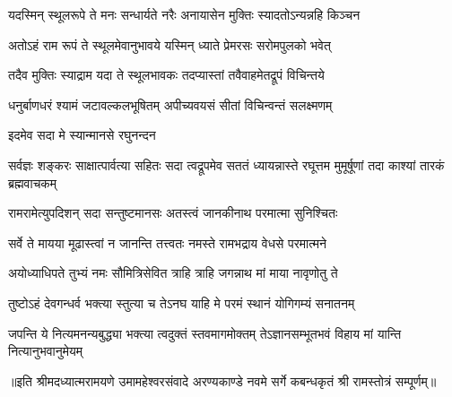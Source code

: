 \twolineshloka
{यदस्मिन् स्थूलरूपे ते मनः सन्धार्यते नरैः}
{अनायासेन मुक्तिः स्यादतोऽन्यन्नहि किञ्चन} %

\twolineshloka
{अतोऽहं राम रूपं ते स्थूलमेवानुभावये}
{यस्मिन् ध्याते प्रेमरसः सरोमपुलको भवेत्} %

\twolineshloka
{तदैव मुक्तिः स्याद्राम यदा ते स्थूलभावकः}
{तदप्यास्तां तवैवाहमेतद्रूपं विचिन्तये} %

\twolineshloka
{धनुर्बाणधरं श्यामं जटावल्कलभूषितम्}
{अपीच्यवयसं सीतां विचिन्वन्तं सलक्ष्मणम्} %

\onelineshloka
{इदमेव सदा मे स्यान्मानसे रघुनन्दन} %


\threelineshloka
{सर्वज्ञः शङ्करः साक्षात्पार्वत्या सहितः सदा}
{त्वद्रूपमेव सततं ध्यायन्नास्ते रघूत्तम}
{मुमूर्षूणां तदा काश्यां तारकं ब्रह्मवाचकम्} %

\twolineshloka
{रामरामेत्युपदिशन् सदा सन्तुष्टमानसः}
{अतस्त्वं जानकीनाथ परमात्मा सुनिश्चितः} %

\twolineshloka
{सर्वे ते मायया मूढास्त्वां न जानन्ति तत्त्वतः}
{नमस्ते रामभद्राय वेधसे परमात्मने} %

\twolineshloka
{अयोध्याधिपते तुभ्यं नमः सौमित्रिसेवित}
{त्राहि त्राहि जगन्नाथ मां माया नावृणोतु ते} %


\twolineshloka
{तुष्टोऽहं देवगन्धर्व भक्त्या स्तुत्या च तेऽनघ}
{याहि मे परमं स्थानं योगिगम्यं सनातनम्} %

\fourlineindentedshloka
{जपन्ति ये नित्यमनन्यबुद्ध्या}
{भक्त्या त्वदुक्तं स्तवमागमोक्तम्}
{तेऽज्ञानसम्भूतभवं विहाय}
{मां यान्ति नित्यानुभवानुमेयम्} %

{॥इति श्रीमदध्यात्मरामयणे उमामहेश्वरसंवादे
अरण्यकाण्डे नवमे  सर्गे  कबन्धकृतं  श्री  रामस्तोत्रं  सम्पूर्णम्॥}

